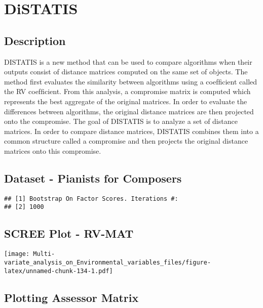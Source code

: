 \documentclass[]{book}
\begin{document}
\hypertarget{distatis-1}{%
\chapter{DiSTATIS}\label{distatis-1}}

\hypertarget{description-8}{%
\section{Description}\label{description-8}}

DISTATIS is a new method that can be used to compare algorithms when
their outputs consist of distance matrices computed on the same set of
objects. The method ﬁrst evaluates the similarity between algorithms
using a coefﬁcient called the RV coefﬁcient. From this analysis, a
compromise matrix is computed which represents the best aggregate of the
original matrices. In order to evaluate the differences between
algorithms, the original distance matrices are then projected onto the
compromise. The goal of DISTATIS is to analyze a set of distance
matrices. In order to compare distance matrices, DISTATIS combines them
into a common structure called a compromise and then projects the
original distance matrices onto this compromise.

\hypertarget{dataset---pianists-for-composers}{%
\section{Dataset - Pianists for
Composers}\label{dataset---pianists-for-composers}}

\begin{verbatim}
## [1] Bootstrap On Factor Scores. Iterations #: 
## [2] 1000
\end{verbatim}

\hypertarget{scree-plot---rv-mat-1}{%
\section{SCREE Plot - RV-MAT}\label{scree-plot---rv-mat-1}}

\texttt{[image: Multi-variate\_analysis\_on\_Environmental\_variables\_files/figure-latex/unnamed-chunk-134-1.pdf]}

\hypertarget{plotting-assessor-matrix-1}{%
\section{Plotting Assessor Matrix}\label{plotting-assessor-matrix-1}}
\end{document}
